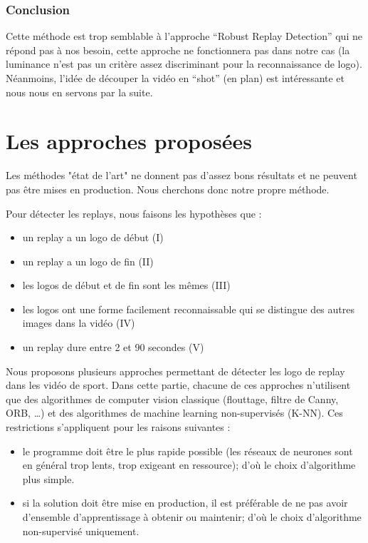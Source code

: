 \documentclass[11pt]{article}
\begin{document}
\subsubsection{Conclusion}
\label{sec:org69547ef}
Cette méthode est trop semblable à l’approche “Robust Replay Detection” qui ne répond pas à nos besoin,
cette approche ne fonctionnera pas dans notre cas (la luminance n’est pas un critère assez discriminant pour la reconnaissance de logo).
Néanmoins, l’idée de découper la vidéo en “shot” (en plan) est intéressante et nous nous en servons par la suite.

\section{Les approches proposées}
\label{sec:orgbedc381}
Les méthodes "état de l'art" ne donnent pas d'assez bons résultats et ne peuvent pas être mises en production. 
Nous cherchons donc notre propre méthode.

Pour détecter les replays, nous faisons les hypothèses que :
\begin{itemize}
\item un replay a un logo de début (I)
\item un replay a un logo de fin (II)
\item les logos de début et de fin sont les mêmes (III)
\item les logos ont une forme facilement reconnaissable qui se distingue des  autres images dans la vidéo (IV)
\item un replay dure entre 2 et 90 secondes (V)
\end{itemize}

Nous proposons plusieurs approches permettant de détecter les logo de replay dans les vidéo de sport. 
Dans cette partie, chacune de ces approches n'utilisent que des algorithmes de computer vision classique (flouttage, filtre de Canny, ORB, \ldots{}) et des algorithmes de machine learning non-supervisés (K-NN).
Ces restrictions s'appliquent pour les raisons suivantes :
\begin{itemize}
\item le programme doit être le plus rapide possible (les réseaux de neurones sont en général trop lents, trop exigeant en ressource); d'où le choix d'algorithme plus simple.
\item si la solution doit être mise en production, il est préférable de ne pas avoir d'ensemble d'apprentissage à obtenir ou maintenir; d'où le choix d'algorithme non-supervisé uniquement.
\end{itemize}
\end{document}
